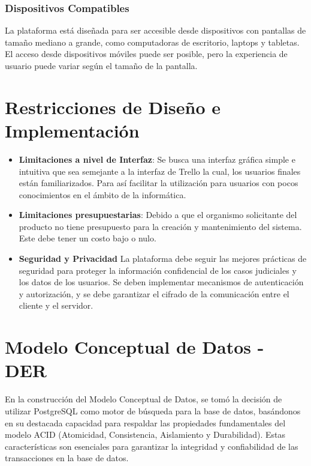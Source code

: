 \subsubsection{Dispositivos Compatibles}
La plataforma está diseñada para ser accesible desde dispositivos con pantallas de tamaño mediano a grande, como computadoras de escritorio, laptops y tabletas. El acceso desde dispositivos móviles puede ser posible, pero la experiencia de usuario puede variar según el tamaño de la pantalla.




\section{Restricciones de Diseño e Implementación}
\begin{itemize}
    \item \textbf{Limitaciones a nivel de Interfaz}:  Se busca una interfaz gráfica simple e intuitiva que sea      semejante a la interfaz de Trello la cual, los usuarios finales están familiarizados. Para así facilitar la utilización para usuarios con pocos conocimientos en el ámbito de la informática.
    \item \textbf{Limitaciones presupuestarias}: Debido a que el organismo solicitante del producto no tiene presupuesto para la creación y mantenimiento del sistema. Este debe tener un costo bajo o nulo.
    \item \textbf{Seguridad y Privacidad}
    La plataforma debe seguir las mejores prácticas de seguridad para proteger la información confidencial de los casos judiciales y los datos de los usuarios. Se deben implementar mecanismos de autenticación y autorización, y se debe garantizar el cifrado de la comunicación entre el cliente y el servidor.
\end{itemize}


\section{Modelo Conceptual de Datos - DER}

En la construcción del Modelo Conceptual de Datos, se tomó la decisión de utilizar PostgreSQL como motor de búsqueda para la base de datos, basándonos en su destacada capacidad para respaldar las propiedades fundamentales del modelo ACID (Atomicidad, Consistencia, Aislamiento y Durabilidad). Estas características son esenciales para garantizar la integridad y confiabilidad de las transacciones en la base de datos.


